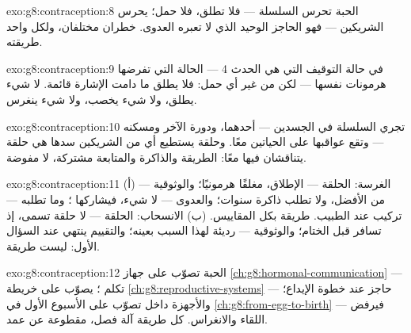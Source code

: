 \begin{solution}{exo:g8:contraception:8}
الحبة تحرس السلسلة --- فلا  تطلق، فلا حمل؛ 
يحرس الشريكين --- فهو الحاجز الوحيد الذي لا تعبره
العدوى. خطران مختلفان، ولكل واحد طريقته.
\end{solution}

\begin{solution}{exo:g8:contraception:9}
في حالة التوقيف التي هي الحدث 4 --- الحالة التي تفرضها
هرمونات  نفسها --- لكن من غير أي حمل: فلا يطلق
  ما دامت الإشارة قائمة. لا شيء يطلق، ولا
شيء يخصب، ولا شيء ينغرس.
\end{solution}

\begin{solution}{exo:g8:contraception:10}
تجري السلسلة في الجسدين ---  أحدهما، ودورة الآخر
ومسكنه --- وتقع عواقبها على الحياتين معًا. وحلقة يستطيع
أي من الشريكين سدها هي حلقة يتناقشان فيها معًا: الطريقة
والذاكرة والمتابعة مشتركة، لا مفوضة.
\end{solution}

\begin{solution}{exo:g8:contraception:11}
(أ) الغرسة: الحلقة --- الإطلاق، مغلقًا هرمونيًا؛
والوثوقية --- من الأفضل، ولا تطلب ذاكرة سنوات؛ والعدوى
--- لا شيء، فيشاركها ؛ وما تطلبه --- تركيب عند
الطبيب. طريقة بكل المقاييس. (ب) الانسحاب: الحلقة --- لا
حلقة تسمى، إذ تسافر  قبل الختام؛ والوثوقية ---
رديئة لهذا السبب بعينه؛ والتقييم ينتهي عند السؤال الأول:
ليست طريقة.
\end{solution}

\begin{solution}{exo:g8:contraception:12}
الحبة تصوّب على جهاز
\cref{ch:g8:hormonal-communication} --- تكلم 
؛  يصوّب على خريطة
\cref{ch:g8:reproductive-systems} --- حاجز عند خطوة
الإيداع؛ والأجهزة داخل  تصوّب على الأسبوع الأول في
\cref{ch:g8:from-egg-to-birth} --- فيرفض اللقاء
والانغراس. كل طريقة آلة فصل، مقطوعة عن عمد.
\end{solution}

